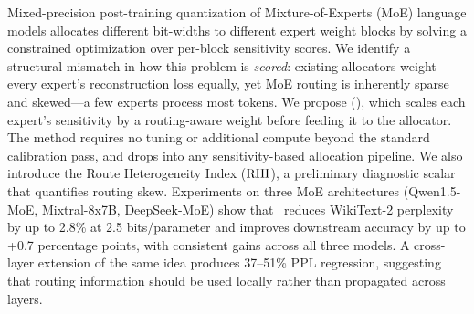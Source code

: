 Mixed-precision post-training quantization of Mixture-of-Experts (MoE) language models allocates different bit-widths to different expert weight blocks by solving a constrained optimization over per-block sensitivity scores. We identify a structural mismatch in how this problem is \emph{scored}: existing allocators weight every expert's reconstruction loss equally, yet MoE routing is inherently sparse and skewed---a few experts process most tokens. We propose \longmethod (\method), which scales each expert's sensitivity by a routing-aware weight before feeding it to the allocator. The method requires no tuning or additional compute beyond the standard calibration pass, and drops into any sensitivity-based allocation pipeline. We also introduce the Route Heterogeneity Index ($\mathrm{RHI}$), a preliminary diagnostic scalar that quantifies routing skew. Experiments on three MoE architectures (Qwen1.5-MoE, Mixtral-8x7B, DeepSeek-MoE) show that \method\ reduces WikiText-2 perplexity by up to 2.8\% at 2.5 bits/parameter and improves downstream accuracy by up to +0.7 percentage points, with consistent gains across all three models. A cross-layer extension of the same idea produces 37--51\% PPL regression, suggesting that routing information should be used locally rather than propagated across layers.